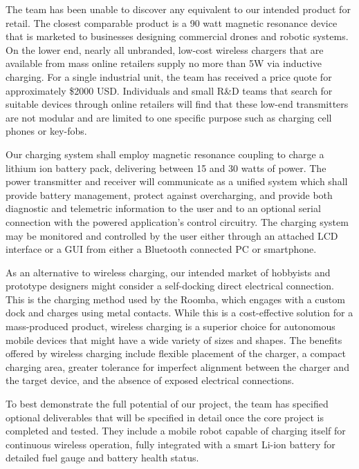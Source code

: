 \documentclass[12pt]{article}
\begin{document}
The team has been unable to discover any equivalent to our intended product for retail. The closest comparable product is a 90 watt magnetic resonance device that is marketed to businesses designing commercial drones and robotic systems. On the lower end, nearly all unbranded, low-cost wireless chargers that are available from mass online retailers supply no more than 5W via inductive charging. For a single industrial unit, the team has received a price quote for approximately \$2000 USD. Individuals and small R\&D teams that search for suitable devices through online retailers will find that these low-end transmitters are not modular and are limited to one specific purpose such as charging cell phones or key-fobs.\\ \indent

Our charging system shall employ magnetic resonance coupling to charge a lithium ion battery pack, delivering between 15 and 30 watts of power. The power transmitter and receiver will communicate as a unified system which shall provide battery management, protect against overcharging, and provide both diagnostic and telemetric information to the user and to an optional serial connection with the powered application’s control circuitry. The charging system may be monitored and controlled by the user either through an attached LCD interface or a GUI from either a Bluetooth connected PC or smartphone.\\ \indent

As an alternative to wireless charging, our intended market of hobbyists and prototype designers might consider a self-docking direct electrical connection. This is the charging method used by the Roomba, which engages with a custom dock and charges using metal contacts. While this is a cost-effective solution for a mass-produced product, wireless charging is a superior choice for autonomous mobile devices that might have a wide variety of sizes and shapes. The benefits offered by wireless charging include flexible placement of the charger, a compact charging area, greater tolerance for imperfect alignment between the charger and the target device, and the absence of exposed electrical connections.\\ \indent

To best demonstrate the full potential of our project, the team has specified optional deliverables that will be specified in detail once the core project is completed and tested. They include a mobile robot capable of charging itself for continuous wireless operation, fully integrated with a smart Li-ion battery for detailed fuel gauge and battery health status.\\ \indent
\end{document}
